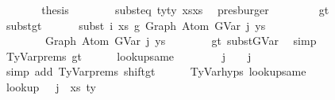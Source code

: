 \begin{isabellebody}
\isanewline
\ \ \ \ \isamarkupfalse%
\ \isamarkupfalse%
\ {\isacharquery}{\kern0pt}thesis\isanewline
\ \ \ \ \ \ \isamarkupfalse%
\ subst{\isacharunderscore}{\kern0pt}eq{\isacharprime}{\kern0pt}\ ty{\isacharprime}{\kern0pt}{\isacharunderscore}{\kern0pt}ty{}\ xs{\isacharprime}{\kern0pt}{\isacharunderscore}{\kern0pt}xs\ \isamarkupfalse%
\ presburger\isanewline
\ \ \isamarkupfalse%
\isanewline
\ \ \ \ \isamarkupfalse%
\ gt\ \ \isanewline
\isanewline
\ \ \ \ \isamarkupfalse%
\ subst{\isacharunderscore}{\kern0pt}gt{\isacharcolon}{\kern0pt}\isanewline
\ \ \ \ \ \ {\isachardoublequoteopen}subst\ i\ xs\ g{}\ {\isacharparenleft}{\kern0pt}Graph\ {\isacharparenleft}{\kern0pt}Atom\ {\isacharparenleft}{\kern0pt}GVar\ j{\isacharparenright}{\kern0pt}\ ys{\isacharparenright}{\kern0pt}{\isacharparenright}{\kern0pt}\isanewline
\ \ \ \ \ \ \ {\isacharequal}{\kern0pt}\ Graph\ {\isacharparenleft}{\kern0pt}Atom\ {\isacharparenleft}{\kern0pt}GVar\ j{\isacharparenright}{\kern0pt}\ ys{\isacharparenright}{\kern0pt}{\isachardoublequoteclose}\isanewline
\ \ \ \ \ \ \isamarkupfalse%
\ gt\ subst{\isacharunderscore}{\kern0pt}GVar\ \isamarkupfalse%
\ simp\isanewline
\isanewline
\ \ \ \ \isamarkupfalse%
\ TyVar{\isachardot}{\kern0pt}prems{\isacharparenleft}{\kern0pt}{}{\isacharparenright}{\kern0pt}\ gt\isanewline
\ \ \ \ \isamarkupfalse%
\ lookup{\isacharunderscore}{\kern0pt}same{\isacharcolon}{\kern0pt}\isanewline
\ \ \ \ \ \ {\isachardoublequoteopen}{\isasymGamma}\ {\isacharbang}{\kern0pt}\ j\ {\isacharequal}{\kern0pt}\ {\isasymGamma}{}\ {\isacharbang}{\kern0pt}\ j{\isachardoublequoteclose}\isanewline
\ \ \ \ \ \ \isamarkupfalse%
\ {\isacharparenleft}{\kern0pt}simp\ add{\isacharcolon}{\kern0pt}\ TyVar{\isachardot}{\kern0pt}prems{\isacharparenleft}{\kern0pt}{}{\isacharcomma}{\kern0pt}{}{\isacharparenright}{\kern0pt}\ shift{\isacharunderscore}{\kern0pt}gt{\isacharparenright}{\kern0pt}\isanewline
\isanewline
\ \ \ \ \isamarkupfalse%
\ TyVar{\isachardot}{\kern0pt}hyps{\isacharparenleft}{\kern0pt}{}{\isacharparenright}{\kern0pt}\ lookup{\isacharunderscore}{\kern0pt}same\isanewline
\ \ \ \ \isamarkupfalse%
\ lookup{}{\isacharcolon}{\kern0pt}\ {\isachardoublequoteopen}{\isasymGamma}{}\ {\isacharbang}{\kern0pt}\ j\ {\isacharequal}{\kern0pt}\ {\isacharparenleft}{\kern0pt}xs{\isacharprime}{\kern0pt}{\isacharcomma}{\kern0pt}\ ty{\isacharprime}{\kern0pt}{\isacharparenright}{\kern0pt}{\isachardoublequoteclose}\ \isamarkupfalse%

\end{isabellebody}
